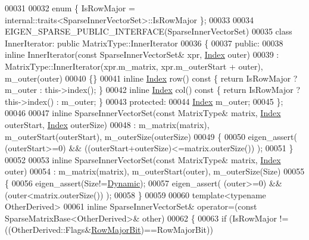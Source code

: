 \begin{DoxyCode}
00031 
00032     \textcolor{keyword}{enum} \{ IsRowMajor = internal::traits<SparseInnerVectorSet>::IsRowMajor \};
00033 
00034     EIGEN\_SPARSE\_PUBLIC\_INTERFACE(SparseInnerVectorSet)
00035     \textcolor{keyword}{class }InnerIterator: \textcolor{keyword}{public} MatrixType::InnerIterator
00036     \{
00037       \textcolor{keyword}{public}:
00038         \textcolor{keyword}{inline} InnerIterator(\textcolor{keyword}{const} SparseInnerVectorSet& xpr, \hyperlink{namespace_eigen_a62e77e0933482dafde8fe197d9a2cfde}{Index} outer)
00039           : MatrixType::InnerIterator(xpr.m\_matrix, xpr.m\_outerStart + outer), m\_outer(outer)
00040         \{\}
00041         \textcolor{keyword}{inline} \hyperlink{namespace_eigen_a62e77e0933482dafde8fe197d9a2cfde}{Index} row()\textcolor{keyword}{ const }\{ \textcolor{keywordflow}{return} IsRowMajor ? m\_outer : this->index(); \}
00042         \textcolor{keyword}{inline} \hyperlink{namespace_eigen_a62e77e0933482dafde8fe197d9a2cfde}{Index} col()\textcolor{keyword}{ const }\{ \textcolor{keywordflow}{return} IsRowMajor ? this->index() : m\_outer; \}
00043       \textcolor{keyword}{protected}:
00044         \hyperlink{namespace_eigen_a62e77e0933482dafde8fe197d9a2cfde}{Index} m\_outer;
00045     \};
00046 
00047     \textcolor{keyword}{inline} SparseInnerVectorSet(\textcolor{keyword}{const} MatrixType& matrix, \hyperlink{namespace_eigen_a62e77e0933482dafde8fe197d9a2cfde}{Index} outerStart, 
      \hyperlink{namespace_eigen_a62e77e0933482dafde8fe197d9a2cfde}{Index} outerSize)
00048       : m\_matrix(matrix), m\_outerStart(outerStart), m\_outerSize(outerSize)
00049     \{
00050       eigen\_assert( (outerStart>=0) && ((outerStart+outerSize)<=matrix.outerSize()) );
00051     \}
00052 
00053     \textcolor{keyword}{inline} SparseInnerVectorSet(\textcolor{keyword}{const} MatrixType& matrix, \hyperlink{namespace_eigen_a62e77e0933482dafde8fe197d9a2cfde}{Index} outer)
00054       : m\_matrix(matrix), m\_outerStart(outer), m\_outerSize(Size)
00055     \{
00056       eigen\_assert(Size!=\hyperlink{namespace_eigen_ad81fa7195215a0ce30017dfac309f0b2}{Dynamic});
00057       eigen\_assert( (outer>=0) && (outer<matrix.outerSize()) );
00058     \}
00059 
00060     \textcolor{keyword}{template}<\textcolor{keyword}{typename} OtherDerived>
00061     \textcolor{keyword}{inline} SparseInnerVectorSet& operator=(\textcolor{keyword}{const} SparseMatrixBase<OtherDerived>& other)
00062     \{
00063       \textcolor{keywordflow}{if} (IsRowMajor != ((OtherDerived::Flags&\hyperlink{group__flags_gae4f56c2a60bbe4bd2e44c5b19cbe8762}{RowMajorBit})==RowMajorBit))

\end{DoxyCode}
